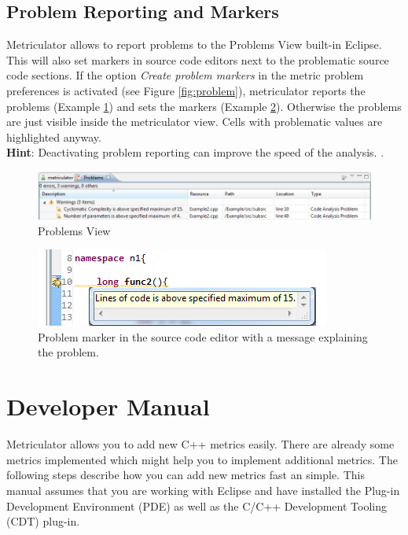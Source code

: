 \documentclass[11pt,a4paper,oneside]{scrreprt}
\begin{document}
\section{Problem Reporting and Markers}
Metriculator allows to report problems to the Problems View built-in Eclipse. This will also set markers in source code editors next to the problematic source code sections. If the option \textit{Create problem markers} in the metric problem preferences is activated (see Figure \ref{fig:problem}), metriculator reports the problems (Example \ref{fig:problems_view_manual}) and sets the markers (Example \ref{fig:marker_manual}). Otherwise the problems are just visible inside the metriculator view. Cells with problematic values are highlighted anyway.\\
\textbf{Hint}: Deactivating problem reporting can improve the speed of the analysis. \cite{eclipse_errrep_slow}.
\begin{figure}[th]
\begin{center}
\includegraphics[scale=0.75]{figures/problems_view.png}
\end{center}
\caption{Problems View}
\label{fig:problems_view_manual}
\end{figure}

\begin{figure}[th]
\begin{center}
\includegraphics{figures/marker.png}
\end{center}
\caption{Problem marker in the source code editor with a message explaining the problem.}
\label{fig:marker_manual}
\end{figure}


\chapter{Developer Manual}
Metriculator allows you to add new C++ metrics easily. There are already some metrics implemented which might help you to implement additional metrics. The following steps describe how you can add new metrics fast an simple.
This manual assumes that you are working with Eclipse and have installed the Plug-in Development Environment (PDE) as well as the C/C++ Development Tooling (CDT) plug-in.
\end{document}
